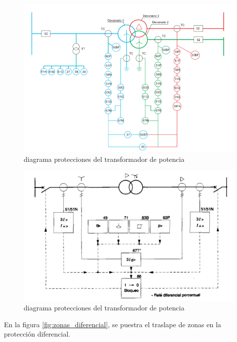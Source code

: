 \documentclass[a5paper]{book}%
\begin{document}
\begin{figure}[H]
	\centering  
	\caption{diagrama protecciones del  transformador de potencia}
	\label{fig:diagramatrafo}
	\includegraphics[width=\linewidth]{diagramapttrafo}
\end{figure}

\begin{figure}[H]
	\centering  
	\caption{diagrama protecciones del  transformador de potencia}
	\label{fig:diagramatrafo1}
	\includegraphics[width=\linewidth]{proteccion_trafo_1}
\end{figure}

En la figura \ref{fig:zonas_diferencial},  se puestra el traslape de
zonas en la protección diferencial.
\end{document}
